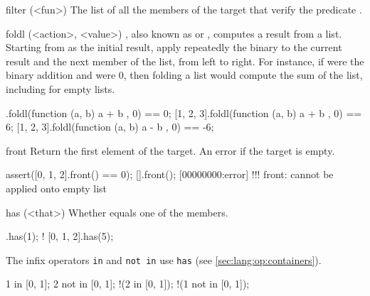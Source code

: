 \begin{urbiscriptapi}
\item[filter](<fun>)%
  The list of all the members of the target that verify the predicate
  .



\item[foldl](<action>, <value>)%
  ,
  also known as  or , computes a result
  from a list.  Starting from  as the initial result, apply
  repeatedly the binary  to the current result and the
  next member of the list, from left to right.  For instance, if
   were the binary addition and  were 0, then
  folding a list would compute the sum of the list, including for
  empty lists.

\begin{urbiassert}
       [].foldl(function (a, b) { a + b }, 0) == 0;
[1, 2, 3].foldl(function (a, b) { a + b }, 0) == 6;
[1, 2, 3].foldl(function (a, b) { a - b }, 0) == -6;
\end{urbiassert}


\item[front]
  Return the first element of the target. An error if the target is
  empty.
\begin{urbiscript}
assert([0, 1, 2].front() == 0);
[].front();
[00000000:error] !!! front: cannot be applied onto empty list
\end{urbiscript}


\item[has](<that>)%
  Whether \that equals one of the members.

\begin{urbiassert}
  [0, 1, 2].has(1);
! [0, 1, 2].has(5);
\end{urbiassert}

  The infix operators \lstinline|in| and \lstinline|not in| use
  \lstinline|has| (see \autoref{sec:lang:op:containers}).

\begin{urbiassert}
  1 in     [0, 1];
  2 not in [0, 1];
!(2 in     [0, 1]);
!(1 not in [0, 1]);
\end{urbiassert}



\end{urbiscriptapi}
